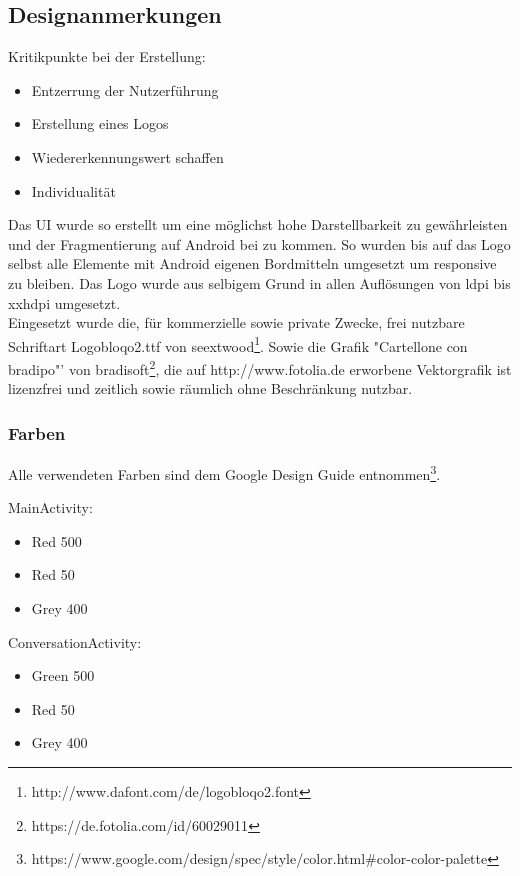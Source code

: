 	\subsection{Designanmerkungen}\label{design}
	
	Kritikpunkte bei der Erstellung:
	\begin{itemize}
	\item Entzerrung der Nutzerführung
	\item Erstellung eines Logos
	\item Wiedererkennungswert schaffen
	\item Individualität
	\end{itemize}
	
	Das UI wurde so erstellt um eine möglichst hohe Darstellbarkeit zu gewährleisten und der Fragmentierung auf Android bei zu kommen. So wurden bis auf das Logo selbst alle Elemente mit Android eigenen Bordmitteln umgesetzt um responsive zu bleiben. Das Logo wurde aus selbigem Grund in allen Auflösungen von ldpi bis xxhdpi umgesetzt.\\
	
	Eingesetzt wurde die, für kommerzielle sowie private Zwecke, frei nutzbare Schriftart Logobloqo2.ttf von seextwood\footnote{\label{foot:1}http://www.dafont.com/de/logobloqo2.font}. Sowie die Grafik "Cartellone con bradipo"' von bradisoft\footnote{\label{foot:2}https://de.fotolia.com/id/60029011}, die auf http://www.fotolia.de erworbene Vektorgrafik ist lizenzfrei und zeitlich sowie räumlich ohne Beschränkung nutzbar.\\
	
	\subsubsection{Farben}\label{farben}
		
		Alle verwendeten Farben sind dem Google Design Guide entnommen\footnote{\label{foot:3}https://www.google.com/design/spec/style/color.html\#color-color-palette}.
		
	MainActivity:
		\begin{itemize}
			\item Red 500
			\item Red 50
			\item Grey 400
		\end{itemize}
	
	ConversationActivity:
		\begin{itemize}
			\item Green 500
			\item Red 50
			\item Grey 400\\
		\end{itemize}
		
